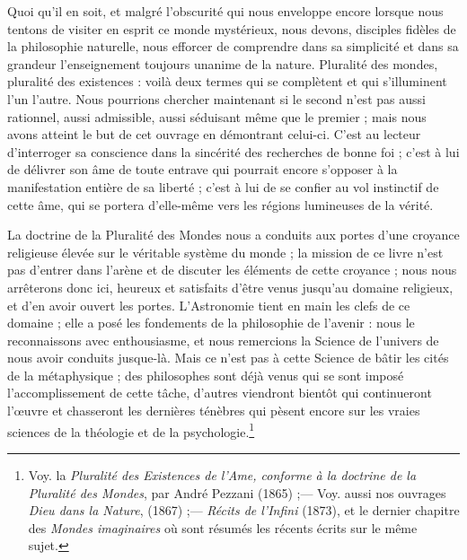 \documentclass[a4paper, 11pt, oneside]{article}
\begin{document}
Quoi qu'il en soit, et malgré l'obscurité qui nous enveloppe encore lorsque nous tentons de visiter en esprit ce monde mystérieux, nous devons, disciples fidèles de la philosophie naturelle, nous efforcer de comprendre dans sa simplicité et dans sa grandeur l'enseignement toujours unanime de la nature. Pluralité des mondes, pluralité des existences : voilà deux termes qui se complètent et qui s'illuminent l'un l'autre. Nous pourrions chercher maintenant si le second n'est pas aussi rationnel, aussi admissible, aussi séduisant même que le premier ; mais nous avons atteint le but de cet ouvrage en démontrant celui-ci. C'est au lecteur d'interroger sa conscience dans la sincérité des recherches de bonne foi ; c'est à lui de délivrer son âme de toute entrave qui pourrait encore s'opposer à la manifestation entière de sa liberté ; c'est à lui de se confier au vol instinctif de cette âme, qui se portera d'elle-même vers les régions lumineuses de la vérité.

La doctrine de la Pluralité des Mondes nous a conduits aux portes d'une croyance religieuse élevée sur le véritable système du monde ; la mission de ce livre n'est pas d'entrer dans l'arène et de discuter les éléments de cette croyance ; nous nous arrêterons donc ici, heureux et satisfaits d'être venus jusqu'au domaine religieux, et d'en avoir ouvert les portes. L'Astronomie tient en main les clefs de ce domaine ; elle a posé les fondements de la philosophie de l'avenir : nous le reconnaissons avec enthousiasme, et nous remercions la Science de l'univers de nous avoir conduits jusque-là. Mais ce n'est pas à cette Science de bâtir les cités de la métaphysique ; des philosophes sont déjà venus qui se sont imposé l'accomplissement de cette tâche, d'autres viendront bientôt qui continueront l'œuvre et chasseront les dernières ténèbres qui pèsent encore sur les vraies sciences de la théologie et de la psychologie.\footnote{Voy. la \emph{Pluralité des Existences de l'Ame, conforme à la doctrine de la Pluralité des Mondes}, par André Pezzani (1865) ;--- Voy. aussi nos ouvrages \emph{Dieu dans la Nature}, (1867) ;--- \emph{Récits de l'Infini} (1873), et le dernier chapitre des \emph{Mondes imaginaires} où sont résumés les récents écrits sur le même sujet.}
\end{document}
